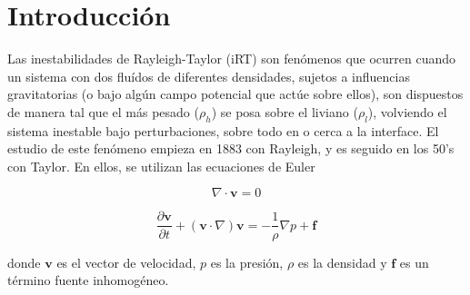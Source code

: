 \section*{Introducción}

Las inestabilidades de Rayleigh-Taylor (iRT) son fenómenos que ocurren cuando un sistema con dos fluídos de diferentes densidades, sujetos a influencias gravitatorias (o bajo algún campo potencial que actúe sobre ellos),
son dispuestos de manera tal que el más pesado ($\rho_h$) se posa sobre el liviano ($\rho_l$),
volviendo el sistema inestable bajo perturbaciones, sobre todo en o cerca a la interface. \cite{Hillier}
El estudio de este fenómeno empieza en 1883 con Rayleigh, y es seguido en los 50's con Taylor. En ellos, se utilizan las ecuaciones de Euler

\begin{equation}
    \nabla \cdot \mathbf{v} = 0
\end{equation}

\begin{equation}
    \frac{\partial \mathbf{v}}{\partial t} + (\mathbf{v} \cdot \nabla) \mathbf{v} = -\frac{1}{\rho} \nabla p + \mathbf{f}
\end{equation}

donde $\mathbf{v}$ es el vector de velocidad, $p$ es la presión, $\rho$ es la densidad y $\mathbf{f}$ es un término fuente inhomogéneo.
